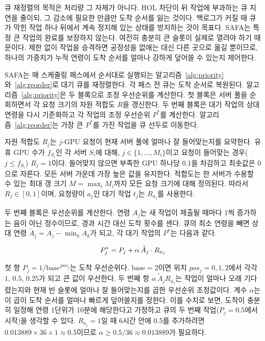 \documentclass{ieeetj}
\begin{document}
큐 재정렬의 목적은 처리량 그 자체가 아니다. HOL 차단이 뒤 작업에 부과하는 큐 지연을 줄이되, 그 감소에 필요한 만큼만 도착 순서를 잃는 것이다. 백로그가 커질 때 큐가 막힌 작업 하나 뒤에서 계속 정지해 있는 상태를 방지하는 것이 목표다. SAFA는 특정 큰 작업의 완료를 보장하지 않는다. 여전히 충분히 큰 슬롯이 실제로 열려야 하기 때문이다. 제한 없이 작업을 승격하면 공정성을 없애는 대신 다른 곳으로 옮길 뿐이므로, 하나의 가중치가 누적 연령이 도착 순서를 얼마나 강하게 덮어쓸 수 있는지 제어한다.

SAFA는 매 스케줄링 패스에서 순서대로 실행되는 알고리즘~\ref{alg:priority}와~\ref{alg:reorder}로 대기 큐를 재정렬한다. 각 패스 전 큐는 도착 순서로 복원된다. 알고리즘~\ref{alg:priority}은 두 블록으로 조정 우선순위를 계산한다. 첫 블록은 서버 풀을 순회하면서 각 요청 크기의 자원 적합도 $R$을 갱신한다. 두 번째 블록은 대기 작업의 상대 연령을 다시 기준화하고 각 작업의 조정 우선순위 $P^*$를 계산한다. 알고리즘~\ref{alg:reorder}는 가장 큰 $P^*$를 가진 작업을 큐 선두로 이동한다.

자원 적합도 $R_j$는 $j$-GPU 요청이 현재 서버 풀에 얼마나 잘 들어맞는지를 요약한다. 유휴 GPU 수가 $f_{S_i}$인 각 서버 $S_i$에 대해, $j\in\{1,\dots,M_i\}$이고 요청이 들어맞는 경우($j\le f_{S_i}$) $R_j=1$이다. 들어맞지 않으면 부족한 GPU 하나당 0.1을 차감하고 최솟값은 0으로 자른다. 모든 서버 가운데 가장 높은 값을 유지한다. 적합도는 한 서버가 수용할 수 있는 최대 갱 크기 $M=\max_i M_i$까지 모든 요청 크기에 대해 정의된다. 따라서 $R_j\in[0,1]$이며, 요청량이 $a_j$인 대기 작업 $t_j$는 $R_{a_j}$를 사용한다.

두 번째 블록은 우선순위를 계산한다. 연령 $A_j$는 새 작업이 제출될 때마다 1씩 증가하는 음이 아닌 정수이므로, 경과 시간 대신 도착 횟수를 센다. 큐의 최소 연령을 빼면 상대 연령 $\tilde A_j=A_j-\min_k A_k$가 되고, 각 대기 작업의 $P^*$는 다음과 같다.

\begin{equation}
P^*_j = P_j + \alpha\, \tilde A_j \cdot R_{a_j}
\label{eq:01}
\vspace{2pt}
\end{equation}

첫 항 $P_j=1/\text{base}^{\,pos_j}$는 도착 우선순위다. $\text{base}=2$이면 위치 $pos_j=0,1,2$에서 각각 $1$, $0.5$, $0.25$가 되고 큰 값이 우선한다. 두 번째 항 $\alpha\,\tilde A_j R_{a_j}$는 작업이 얼마나 오래 기다렸는지와 현재 빈 슬롯에 얼마나 잘 들어맞는지를 곱한 우선순위 조정값이다. 계수 $\alpha$는 이 곱이 도착 순서를 얼마나 빠르게 덮어쓸지를 정한다. 이를 수치로 보면, 도착이 충분히 일정해 연령 1단위가 10분에 해당한다고 가정하고 큐의 두 번째 작업($P_j=0.5$에서 시작)을 생각할 수 있다. $R_{a_j}=1$일 때 6시간 안에 0.5를 추가하려면 $0.013889\times36\times1\approx0.5$이므로 $\alpha\ge0.5/36\approx0.013889$가 필요하다.
\end{document}
